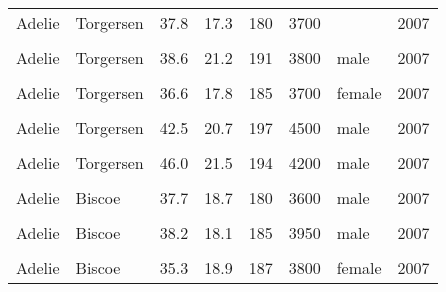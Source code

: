 \documentclass[
  landscape]{article}
\begin{document}
\begin{longtable}[l]{llllllll}
Adelie & Torgersen & 37.8 & 17.3 & 180 & 3700 &  & 2007\\
\cellcolor{gray!15}{Adelie} & \cellcolor{gray!15}{Torgersen} & \cellcolor{gray!15}{41.1} & \cellcolor{gray!15}{17.6} & \cellcolor{gray!15}{182} & \cellcolor{gray!15}{3200} & \cellcolor{gray!15}{female} & \cellcolor{gray!15}{2007}\\
Adelie & Torgersen & 38.6 & 21.2 & 191 & 3800 & male & 2007\\
\cellcolor{gray!15}{Adelie} & \cellcolor{gray!15}{Torgersen} & \cellcolor{gray!15}{34.6} & \cellcolor{gray!15}{21.1} & \cellcolor{gray!15}{198} & \cellcolor{gray!15}{4400} & \cellcolor{gray!15}{male} & \cellcolor{gray!15}{2007}\\
Adelie & Torgersen & 36.6 & 17.8 & 185 & 3700 & female & 2007\\
\cellcolor{gray!15}{Adelie} & \cellcolor{gray!15}{Torgersen} & \cellcolor{gray!15}{38.7} & \cellcolor{gray!15}{19.0} & \cellcolor{gray!15}{195} & \cellcolor{gray!15}{3450} & \cellcolor{gray!15}{female} & \cellcolor{gray!15}{2007}\\
Adelie & Torgersen & 42.5 & 20.7 & 197 & 4500 & male & 2007\\
\cellcolor{gray!15}{Adelie} & \cellcolor{gray!15}{Torgersen} & \cellcolor{gray!15}{34.4} & \cellcolor{gray!15}{18.4} & \cellcolor{gray!15}{184} & \cellcolor{gray!15}{3325} & \cellcolor{gray!15}{female} & \cellcolor{gray!15}{2007}\\
Adelie & Torgersen & 46.0 & 21.5 & 194 & 4200 & male & 2007\\
\cellcolor{gray!15}{Adelie} & \cellcolor{gray!15}{Biscoe} & \cellcolor{gray!15}{37.8} & \cellcolor{gray!15}{18.3} & \cellcolor{gray!15}{174} & \cellcolor{gray!15}{3400} & \cellcolor{gray!15}{female} & \cellcolor{gray!15}{2007}\\
Adelie & Biscoe & 37.7 & 18.7 & 180 & 3600 & male & 2007\\
\cellcolor{gray!15}{Adelie} & \cellcolor{gray!15}{Biscoe} & \cellcolor{gray!15}{35.9} & \cellcolor{gray!15}{19.2} & \cellcolor{gray!15}{189} & \cellcolor{gray!15}{3800} & \cellcolor{gray!15}{female} & \cellcolor{gray!15}{2007}\\
Adelie & Biscoe & 38.2 & 18.1 & 185 & 3950 & male & 2007\\
\cellcolor{gray!15}{Adelie} & \cellcolor{gray!15}{Biscoe} & \cellcolor{gray!15}{38.8} & \cellcolor{gray!15}{17.2} & \cellcolor{gray!15}{180} & \cellcolor{gray!15}{3800} & \cellcolor{gray!15}{male} & \cellcolor{gray!15}{2007}\\
Adelie & Biscoe & 35.3 & 18.9 & 187 & 3800 & female & 2007\\

\end{longtable}
\end{document}
